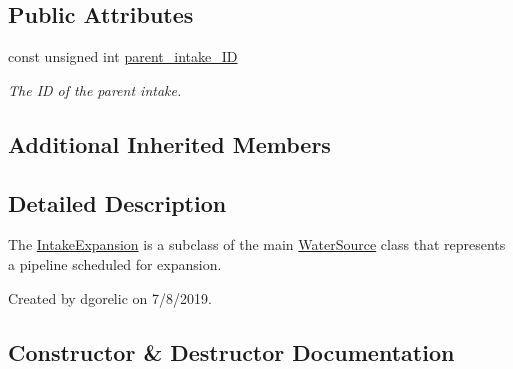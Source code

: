 \subsection*{Public Attributes}
\begin{DoxyCompactItemize}
\item 
const unsigned int \mbox{\hyperlink{classIntakeExpansion_a93569405968a66226046e730e691615c}{parent\+\_\+intake\+\_\+\+ID}}
\begin{DoxyCompactList}\small\item\em The ID of the parent intake. \end{DoxyCompactList}\end{DoxyCompactItemize}
\subsection*{Additional Inherited Members}


\subsection{Detailed Description}
The {\ttfamily \mbox{\hyperlink{classIntakeExpansion}{Intake\+Expansion}}} is a subclass of the main {\ttfamily \mbox{\hyperlink{classWaterSource}{Water\+Source}}} class that represents a pipeline scheduled for expansion. 

Created by dgorelic on 7/8/2019. 

\subsection{Constructor \& Destructor Documentation}
\mbox{\label{classIntakeExpansion_abf871880367036c599caab901eb46339}} 
